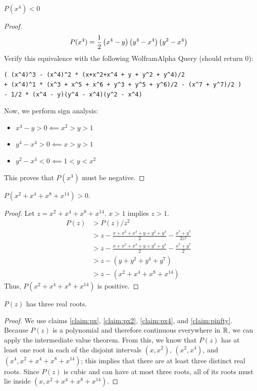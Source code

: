 \documentclass[10pt]{../usamts}
\begin{document}
\begin{solution}
\begin{claim}
    $P(x^4) < 0$
    \label{claim:px4}
\end{claim}
\begin{proof}
    $$P(x^4) = \frac{1}{2} \left( x^4-y \right) \left( y^4 - x^4 \right)\left( y^2 - x^4 \right)$$ 
    Verify this equivalence with the following WolframAlpha Query (should return 0): 
    \begin{verbatim}
( (x^4)^3 - (x^4)^2 * (x+x^2+x^4 + y + y^2 + y^4)/2 
+ (x^4)^1 * (x^3 + x^5 + x^6 + y^3 + y^5 + y^6)/2 - (x^7 + y^7)/2 )
- 1/2 * (x^4 - y)(y^4 - x^4)(y^2 - x^4)
    \end{verbatim}
    Now, we perform sign analysis:
    \begin{itemize}
        \item $x^4 - y > 0 \impliedby x^2 > y > 1$
        \item $y^4 - x^4 > 0 \impliedby x > y > 1$
        \item $y^2 - x^4 < 0 \impliedby 1 < y < x^2$
    \end{itemize}
    This proves that $P(x^3)$ must be negative.
\end{proof}

\begin{claim}
    $P(x^2 + x^4 + x^8 + x^{14}) > 0$.
    \label{claim:pinfty}
\end{claim}
\begin{proof}
    Let $z = x^2 + x^4 + x^8 + x^{14}$. $x > 1$ implies $z > 1$.
    \begin{align*}
    P(z) &> P(z)/z^2 \\
         &> z - \frac{x+x^2+x^4+y+y^2+y^4}{2} - \frac{x^7+y^7}{2z^2} \\
         &> z - \frac{x+x^2+x^4+y+y^2+y^4}{2} - \frac{x^7+y^7}{2} \\
         &> z - (y + y^2 + y^4 + y^7) \\
         &> z - (x^2 + x^4 + x^8 + x^{14})
    \end{align*}
    Thus,  $P(x^2 + x^4 + x^8 + x^{14})$ is positive.
\end{proof}

\begin{claim}
    $P(z)$ has three real roots.
\end{claim}

\begin{proof}
    We use claims \ref{claim:px}, \ref{claim:px2}, \ref{claim:px4}, and \ref{claim:pinfty}.
    Because $P(z)$ is a polynomial and therefore continuous everywhere in $\mathbb{R}$, we can apply the intermediate value theorem.
    From this, we know that $P(z)$ has at least one root in each of the disjoint intervals $(x, x^2)$, $(x^2, x^4)$, and $(x^4, x^2 + x^4 + x^8 + x^{14})$; this implies that there are at least three distinct real roots. Since $P(z)$ is cubic and can have at most three roots, all of its roots must lie inside $(x,x^2 + x^4 + x^8 + x^{14})$.
\end{proof}

\end{solution}
\end{document}
